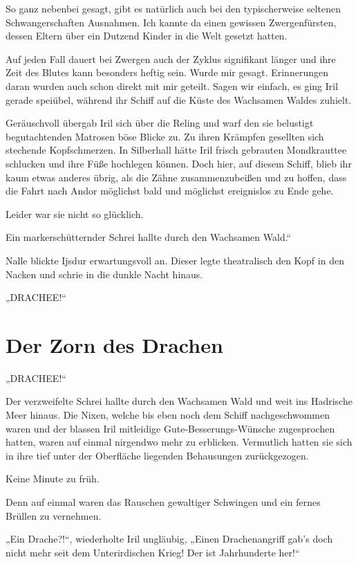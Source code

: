 So ganz nebenbei gesagt, gibt es natürlich auch bei den typischerweise seltenen Schwangerschaften Ausnahmen. Ich kannte da einen gewissen Zwergenfürsten, dessen Eltern über ein Dutzend Kinder in die Welt gesetzt hatten.

Auf jeden Fall dauert bei Zwergen auch der Zyklus signifikant länger und ihre Zeit des Blutes kann besonders heftig sein. Wurde mir gesagt. Erinnerungen daran wurden auch schon direkt mit mir geteilt. Sagen wir einfach, es ging Iril gerade speiübel, während ihr Schiff auf die Küste des Wachsamen Waldes zuhielt.

Geräuschvoll übergab Iril sich über die Reling und warf den sie belustigt begutachtenden Matrosen böse Blicke zu. Zu ihren Krämpfen gesellten sich stechende Kopfschmerzen. In Silberhall hätte Iril frisch gebrauten Mondkrauttee schlucken und ihre Füße hochlegen können. Doch hier, auf diesem Schiff, blieb ihr kaum etwas anderes übrig, als die Zähne zusammenzubeißen und zu hoffen, dass die Fahrt nach Andor möglichst bald und möglichst ereignislos zu Ende gehe.

Leider war sie nicht so glücklich.

Ein markerschütternder Schrei hallte durch den Wachsamen Wald.“

Nalle blickte Ijsdur erwartungsvoll an. Dieser legte theatralisch den Kopf in den Nacken und schrie in die dunkle Nacht hinaus.

„DRACHEE!“



\newpage
\section{Der Zorn des Drachen}



„DRACHEE!“

Der verzweifelte Schrei hallte durch den Wachsamen Wald und weit ins Hadrische Meer hinaus. Die Nixen, welche bis eben noch dem Schiff nachgeschwommen waren und der blassen Iril mitleidige Gute-Besserungs-Wünsche zugesprochen hatten, waren auf einmal nirgendwo mehr zu erblicken. Vermutlich hatten sie sich in ihre tief unter der Oberfläche liegenden Behausungen zurückgezogen.

Keine Minute zu früh.

Denn auf einmal waren das Rauschen gewaltiger Schwingen und ein fernes Brüllen zu vernehmen.

„Ein Drache?!“, wiederholte Iril ungläubig, „Einen Drachenangriff gab’s doch nicht mehr seit dem Unterirdischen Krieg! Der ist Jahrhunderte her!“

